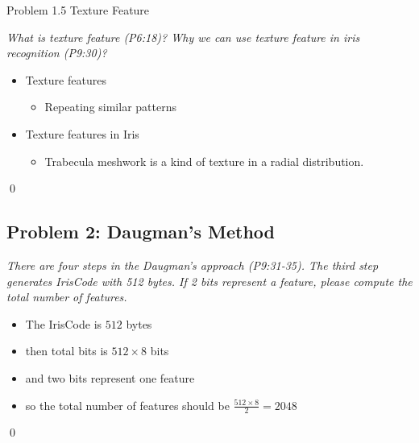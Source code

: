 \documentclass[
        ]{beamer}
\begin{document}
    		\begin{frame}[t]{Problem 1.5 Texture Feature}    		
    			\begin{overprint}
    			\emph{What is texture feature (P6:18)? Why we can use texture feature in iris recognition (P9:30)?}
    			\onslide<2>  %
    			\onslide<3> 
    			\onslide<4>
    				\begin{itemize}
    				\item Texture features		
    					\begin{itemize}
    					\item Repeating similar patterns
    					\end{itemize}		
    				\item Texture features in Iris	
    					\begin{itemize}
    					\item Trabecula meshwork is a kind of texture in a radial distribution.
    					\end{itemize}		
    				\end{itemize}\qed	
    			\end{overprint}
    		\end{frame}
    		
    \subsection{Problem 2: Daugman's Method}
    
    		\begin{frame}[t]{\subsecname}
    			\begin{overprint}
    			\onslide<1>
    			\emph{There are four steps in the Daugman's approach (P9:31-35). The third step generates IrisCode with 512 bytes. If 2 bits represent a feature, please compute the total number of features.}
    			\onslide<2> \inpdfc{9}{31}
    			\onslide<3> \inpdfc{9}{32}
    			\onslide<4> \inpdfc{9}{33}
    			\onslide<5> \inpdfc{9}{34}
    			\onslide<6> \inpdfc{9}{35}
    			\onslide<7>
    				\begin{itemize}
    				\item The IrisCode is $512$ bytes
    				\item then total bits is $512\times 8$ bits
    				\item and two bits represent one feature
    				\item so the total number of features should be $\frac{512\times 8}{2} = 2048$
    				\end{itemize}\qed	
    			\end{overprint}
    		\end{frame}
    		
\end{document}
